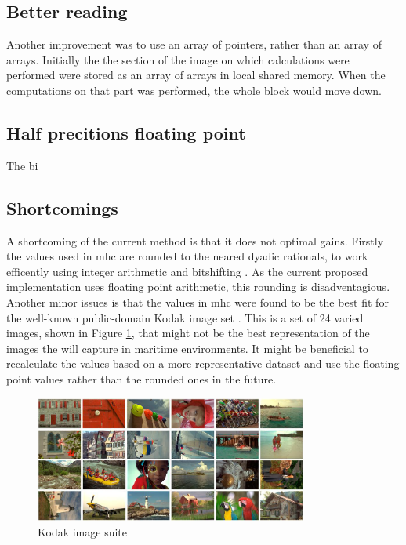 \subsection{Better reading}
Another improvement was to use an array of pointers, rather than an array of arrays.
Initially the the section of the image on which calculations were performed were stored as an array of arrays in local shared memory.
When the computations on that part was performed, the whole block would move down.


\subsection{Half precitions floating point}
The bi



\subsection{Shortcomings}
A shortcoming of the current method is that it does not optimal gains.
Firstly the values used in \gls{mhc} are rounded to the neared dyadic rationals, to work efficently using integer arithmetic and bitshifting \cite{getreuerMalvarHeCutlerLinearImage2011}.
As the current proposed implementation uses floating point arithmetic, this rounding is disadventagious.
Another minor issues is that the values in \gls{mhc} were found to be the best fit for the well-known public-domain Kodak image set \cite{malvarHighqualityGradientcorrectedLinear2009}.
This is a set of 24 varied images, shown in Figure \ref{fig:kodak_image_suite}, that might not be the best representation of the images the \sr will capture in maritime environments.
It might be beneficial to recalculate the values based on a more representative dataset and use the floating point values rather than the rounded ones in the future.


\begin{figure}[H]
    \centering
    \includegraphics[width=0.8\textwidth]{figures/debayer/kodak_test_suite.png}
    \caption{Kodak image suite \cite{franzenTrueColorKodak2013}\cite{chungAdaptiveColorFilter2006}}
    \label{fig:kodak_image_suite}
\end{figure}


